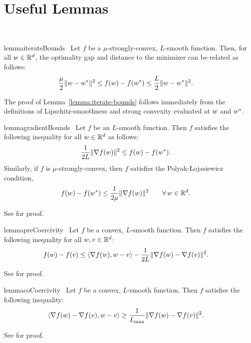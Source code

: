 
\chapter{Useful Lemmas}~\label{app:useful-lemmas}

\begin{restatable}{lemma}{iterateBounds}~\label{lemma:iterate-bounds}
    Let \( f \) be a \( \mu \)-strongly-convex, \( L \)-smooth function. 
    Then, for all \( w \in \mathbb{R}^d \), the optimality gap and distance to the minimizer can be related as follows: 
    \[ \frac{\mu}{2} \|w - w^*\|^2 \leq f(w) - f(w^*) \leq \frac{L}{2} \|w - w^*\|^2. \]
\end{restatable}

The proof of Lemma~\ref{lemma:iterate-bounds} follows immediately from the definitions of Lipschitz-smoothness and strong convexity evaluated at \( w \) and \( w^* \).

\begin{restatable}{lemma}{gradientBounds}~\label{lemma:gradient-bounds}
    Let \( f \) be an \( L \)-smooth function. 
    Then \( f \) satisfies the following inequality for all  \( w \in \mathbb{R}^d \) as follows: 
    \[ \frac{1}{2L} \|\nabla f(w)\|^2 \leq f(w) - f(w^*). \]
    Similarly, if \( f \) is \( \mu \)-strongly-convex, then \( f \) satisfies the Polyak-Łojasiewicz condition, 
    \[ f(w) - f(w^*) \leq \frac{1}{2 \mu}\|\nabla f(w)\|^2 \quad \quad \forall \, w \in \mathbb{R}^d. \]
\end{restatable}
\noindent See \citet{karimi2016linear} for proof.

\begin{restatable}{lemma}{preCoercivity}~\label{lemma:pre-coercivity}
    Let \( f  \) be a convex, \( L  \)-smooth function. 
    Then \( f  \) satisfies the following inequality for all \( w, v \in \mathbb{R}^d \):
    \[ f(w) - f(v)  \leq  \left\langle\nabla f(w), w - v\right\rangle- \frac{1}{2L} \|\nabla f(w) - \nabla f(v)\|^2. \] 
\end{restatable}
\noindent See \citet[Lemma 3.5]{bubeck2015convex} for proof.

\begin{restatable}{lemma}{coCoercivity}~\label{lemma:co-coercivity}
    Let \( f \) be a convex, \( L  \)-smooth function. 
    Then \( f \) satisfies the following inequality:
    \[ \left\langle\nabla f(w) - \nabla f(v), w - v\right\rangle \geq \frac{1}{L_{\text{max}}}\|\nabla f(w) - \nabla f(v)\|^2. \]
\end{restatable}
\noindent See \citet[Eq. 3.6]{bubeck2015convex} for proof.

